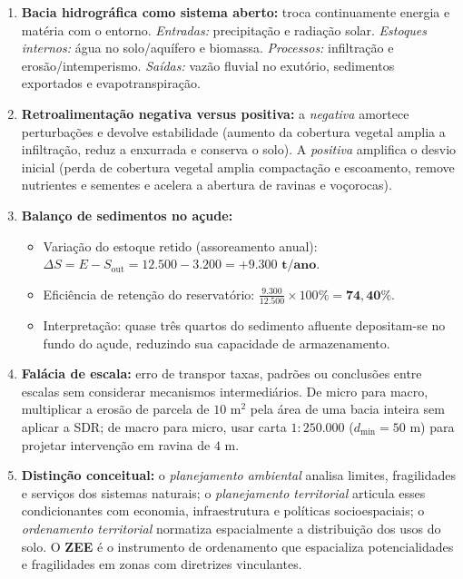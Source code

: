 \begin{boxGabarito}
  \begin{enumerate}[leftmargin=1.8em, itemsep=4pt]
    \item \textbf{Bacia hidrográfica como sistema aberto:} troca continuamente energia e matéria com o entorno. \emph{Entradas:} precipitação e radiação solar. \emph{Estoques internos:} água no solo/aquífero e biomassa. \emph{Processos:} infiltração e erosão/intemperismo. \emph{Saídas:} vazão fluvial no exutório, sedimentos exportados e evapotranspiração.

    \item \textbf{Retroalimentação negativa versus positiva:} a \emph{negativa} amortece perturbações e devolve estabilidade (aumento da cobertura vegetal amplia a infiltração, reduz a enxurrada e conserva o solo). A \emph{positiva} amplifica o desvio inicial (perda de cobertura vegetal amplia compactação e escoamento, remove nutrientes e sementes e acelera a abertura de ravinas e voçorocas).

    \item \textbf{Balanço de sedimentos no açude:}
    \begin{itemize}[leftmargin=1.4em, itemsep=1pt]
      \item Variação do estoque retido (assoreamento anual): $\Delta S = E - S_{\text{out}} = 12.500 - 3.200 = \mathbf{+9.300\text{ t/ano}}$.
      \item Eficiência de retenção do reservatório: $\frac{9.300}{12.500} \times 100\% = \mathbf{74{,}40\%}$.
      \item Interpretação: quase três quartos do sedimento afluente depositam-se no fundo do açude, reduzindo sua capacidade de armazenamento.
    \end{itemize}

    \item \textbf{Falácia de escala:} erro de transpor taxas, padrões ou conclusões entre escalas sem considerar mecanismos intermediários. De micro para macro, multiplicar a erosão de parcela de $10\text{ m}^2$ pela área de uma bacia inteira sem aplicar a SDR; de macro para micro, usar carta $1{:}250.000$ ($d_{\min} = 50\text{ m}$) para projetar intervenção em ravina de $4\text{ m}$.

    \item \textbf{Distinção conceitual:} o \emph{planejamento ambiental} analisa limites, fragilidades e serviços dos sistemas naturais; o \emph{planejamento territorial} articula esses condicionantes com economia, infraestrutura e políticas socioespaciais; o \emph{ordenamento territorial} normatiza espacialmente a distribuição dos usos do solo. O \textbf{ZEE} é o instrumento de ordenamento que espacializa potencialidades e fragilidades em zonas com diretrizes vinculantes.


\end{enumerate}
\end{boxGabarito}
